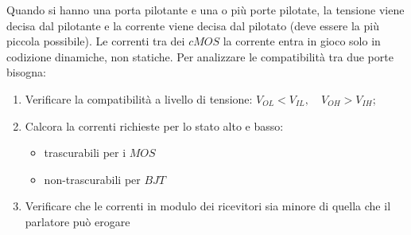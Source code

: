 \documentclass[12pt]{article}
\begin{document}
Quando si hanno una porta pilotante e una o pi\`u porte pilotate, la tensione viene decisa dal pilotante e la corrente viene decisa dal pilotato (deve essere la pi\`u piccola possibile). Le correnti tra dei $cMOS$ la corrente entra in gioco solo in codizione dinamiche, non statiche. Per analizzare le compatibilit\`a tra due porte bisogna:
\begin{enumerate}
    \item Verificare la compatibilit\`a a livello di tensione: $V_{OL} < V_{IL},\quad V_{OH} > V_{IH} $;
    \item Calcora la correnti richieste per lo stato alto e basso:
        \begin{itemize}
            \item trascurabili per i $MOS$
            \item non-trascurabili per $BJT$
        \end{itemize}
    \item Verificare che le correnti in modulo dei ricevitori sia minore di quella che il parlatore pu\`o erogare
\end{enumerate}
\end{document}
